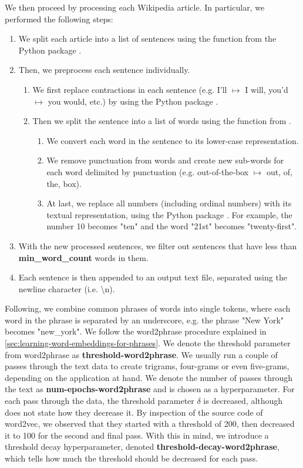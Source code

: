 We then proceed by processing each Wikipedia article. In particular, we performed the following steps:
\begin{enumerate}
    \item We split each article into a list of sentences using the  function from the  Python package \cite{bird2009natural}.
    \item Then, we preprocess each sentence individually.
    \begin{enumerate}
        \item We first replace contractions in each sentence (e.g. I'll $\mapsto$ I will, you'd $\mapsto$ you would, etc.) by using the  Python package \cite{contractions-2016}.
        \item Then we split the sentence into a list of words using the  function from .
        \begin{enumerate}
            \item We convert each word in the sentence to its lower-case representation.
            \item We remove punctuation from words and create new sub-words for each word delimited by punctuation (e.g. out-of-the-box $\mapsto$ out, of, the, box).
            \item At last, we replace all numbers (including ordinal numbers) with its textual representation, using the  Python package \cite{num2words2014}. For example, the number 10 becomes "ten" and the word "21st" becomes "twenty-first".
        \end{enumerate}
    \end{enumerate}
    \item With the new processed sentences, we filter out sentences that have less than \textbf{min\_word\_count} words in them.
    \item Each sentence is then appended to an output text file, separated using the newline character (i.e. \textbackslash n).
\end{enumerate}

Following, we combine common phrases of words into single tokens, where each word in the phrase is separated by an underscore, e.g. the phrase "New York" becomes "new\_york". We follow the word2phrase procedure explained in \cref{sec:learning-word-embeddings-for-phrases}. We denote the threshold parameter from word2phrase as \textbf{threshold-word2phrase}. We usually run a couple of passes through the text data to create trigrams, four-grams or even five-grams, depending on the application at hand. We denote the number of passes through the text as \textbf{num-epochs-word2phrase} and is chosen as a hyperparameter. For each pass through the data, the threshold parameter $\delta$ is decreased, although \cite{mikolov2013b} does not state how they decrease it. By inspection of the source code of word2vec, we observed that they started with a threshold of 200, then decreased it to 100 for the second and final pass. With this in mind, we introduce a threshold decay hyperparameter, denoted \textbf{threshold-decay-word2phrase}, which tells how much the threshold should be decreased for each pass.

